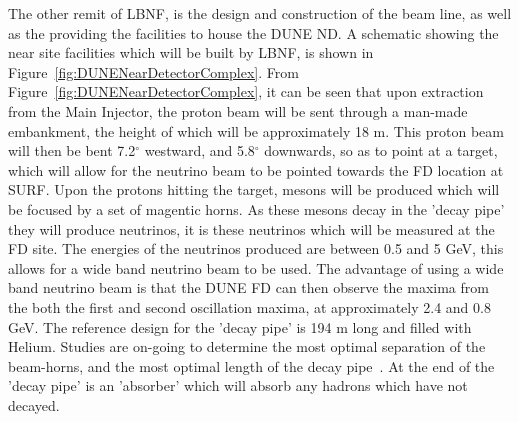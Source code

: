 The other remit of LBNF, is the design and construction of the beam line, as well as the providing the facilities to house the DUNE ND. A schematic showing the near site facilities which will be built by LBNF, is shown in Figure~\ref{fig:DUNENearDetectorComplex}. From Figure~\ref{fig:DUNENearDetectorComplex}, it can be seen that upon extraction from the Main Injector, the proton beam will be sent through a man-made embankment, the height of which will be approximately 18 m. This proton beam will then be bent 7.2$^{\circ}$ westward, and 5.8$^{\circ}$ downwards, so as to point at a target, which will allow for the neutrino beam to be pointed towards the FD location at SURF. Upon the protons hitting the target, mesons will be produced which will be focused by a set of magentic horns. As these mesons decay in the 'decay pipe' they will produce neutrinos, it is these neutrinos which will be measured at the FD site. The energies of the neutrinos produced are between 0.5 and 5 GeV, this allows for a wide band neutrino beam to be used. The advantage of using a wide band neutrino beam is that the DUNE FD can then observe the maxima from the both the first and second oscillation maxima, at approximately 2.4 and 0.8 GeV. The reference design for the 'decay pipe' is 194 m long and filled with Helium. Studies are on-going to determine the most optimal separation of the beam-horns, and the most optimal length of the decay pipe~\citep{DUNECDR_V2, DUNECDR_V3}. At the end of the 'decay pipe' is an 'absorber' which will absorb any hadrons which have not decayed. \\

